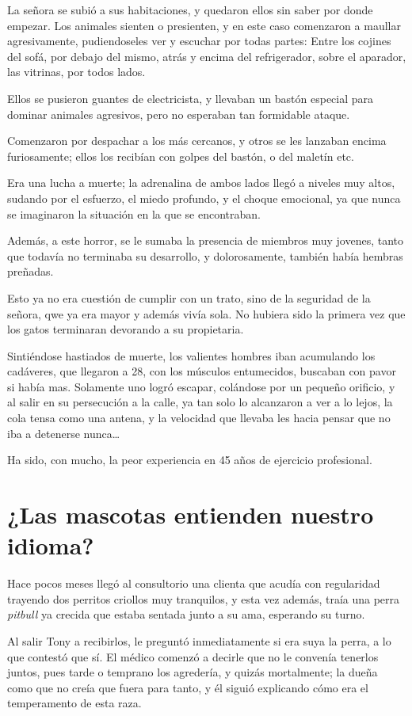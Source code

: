 \documentclass[letterpaper, 12pt]{book}
\begin{document}
La señora se subió a sus habitaciones, y quedaron ellos sin saber por donde empezar. Los animales sienten o presienten, y en este caso comenzaron a maullar agresivamente, pudiendoseles ver y escuchar por todas partes: Entre los cojines del sofá, por debajo del mismo, atrás y encima del refrigerador, sobre el aparador, las vitrinas, por todos lados. 

Ellos se pusieron guantes de electricista, y llevaban un bastón especial para dominar animales agresivos, pero no esperaban tan formidable ataque.

Comenzaron por despachar a los más cercanos, y otros se les lanzaban encima furiosamente; ellos los recibían con golpes del bastón, o del maletín etc.

Era una lucha a muerte; la adrenalina de ambos lados llegó a niveles muy altos, sudando por el esfuerzo, el miedo profundo, y el choque emocional, ya que nunca se imaginaron la situación en la que se encontraban.

Además, a este horror, se le sumaba la presencia de miembros muy jovenes, tanto que todavía no terminaba su desarrollo, y dolorosamente, también había hembras preñadas.

Esto ya no era cuestión de cumplir con un trato, sino de la seguridad de la señora, qwe ya era mayor y además vivía sola. No hubiera sido la primera vez que los gatos terminaran devorando a su propietaria.

Sintiéndose hastiados de muerte, los valientes hombres iban acumulando los cadáveres, que llegaron a 28, con los músculos entumecidos, buscaban con pavor si había mas. Solamente uno logró escapar, colándose por un pequeño orificio, y al salir en su persecución a la calle, ya tan solo lo alcanzaron a ver a lo lejos, la cola tensa como una antena, y la velocidad que llevaba les hacia pensar que no iba a detenerse nunca\ldots

Ha sido, con mucho, la peor experiencia en 45 años de ejercicio profesional.

\chapter{¿Las mascotas entienden nuestro idioma?}
Hace pocos meses llegó al consultorio una clienta que acudía con regularidad trayendo dos perritos criollos muy tranquilos, y esta vez además, traía una perra \textit{pitbull} ya crecida que estaba sentada junto a su ama, esperando su turno.

Al salir Tony a recibirlos, le preguntó inmediatamente si era suya la perra, a lo que contestó que sí. El médico comenzó a decirle que no le convenía tenerlos juntos, pues tarde o temprano los agredería, y quizás mortalmente; la dueña como que no creía que fuera para tanto, y él siguió explicando cómo era el temperamento de esta raza.
\end{document}

